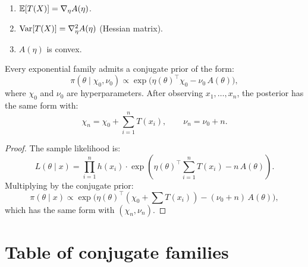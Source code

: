\begin{proposition}
\begin{enumerate}
  \item $\mathbb{E}[T(X)] = \nabla_\eta A(\eta)$.
  \item $\mathrm{Var}[T(X)] = \nabla^2_\eta A(\eta)$ (Hessian matrix).
  \item $A(\eta)$ is convex.
\end{enumerate}
\end{proposition}

\begin{theorem}
Every exponential family admits a conjugate prior of the form:
\[
  \pi(\theta \mid \chi_0, \nu_0) \propto
  \exp\!\big(\eta(\theta)^\top \chi_0 - \nu_0\,A(\theta)\big),
\]
where $\chi_0$ and $\nu_0$ are hyperparameters. After observing
$x_1, \ldots, x_n$, the posterior has the same form with:
\[
  \chi_n = \chi_0 + \sum_{i=1}^n T(x_i), \qquad
  \nu_n = \nu_0 + n.
\]
\end{theorem}

\begin{proof}
The sample likelihood is:
\[
  L(\theta \mid x) = \prod_{i=1}^n h(x_i) \cdot
  \exp\!\left(\eta(\theta)^\top \sum_{i=1}^n T(x_i) - n\,A(\theta)\right).
\]
Multiplying by the conjugate prior:
\[
  \pi(\theta \mid x) \propto
  \exp\!\big(\eta(\theta)^\top (\chi_0 + \textstyle\sum T(x_i))
  - (\nu_0 + n)\,A(\theta)\big),
\]
which has the same form with $(\chi_n, \nu_n)$.
\end{proof}

\section{Table of conjugate families}

